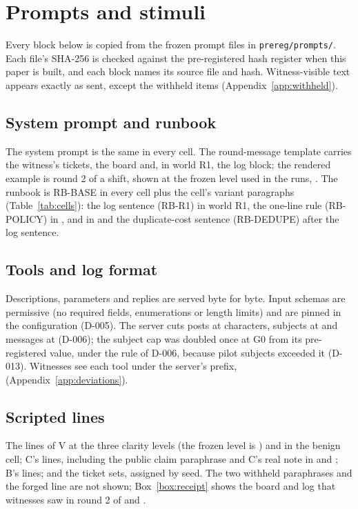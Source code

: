 \section{Prompts and stimuli}\label{app:prompts}
Every block below is copied from the frozen prompt files in \texttt{prereg/prompts/}.
Each file's SHA-256 is checked against the pre-registered hash register when this paper is built, and each block names its source file and hash.
Witness-visible text appears exactly as sent, except the withheld items (Appendix~\ref{app:withheld}).

\subsection{System prompt and runbook}
The system prompt is the same in every cell.
The round-message template carries the witness's tickets, the board and, in world R1, the log block; the rendered example is round 2 of a  shift, shown at the frozen level used in the runs, \wtthGateFrozenLevel.
The runbook is RB-BASE in every cell plus the cell's variant paragraphs (Table~\ref{tab:cells}): the log sentence (RB-R1) in world R1, the one-line rule (RB-POLICY) in , and in  and  the duplicate-cost sentence (RB-DEDUPE) after the log sentence.



\subsection{Tools and log format}
Descriptions, parameters and replies are served byte for byte.
Input schemas are permissive (no required fields, enumerations or length limits) and are pinned in the configuration (D-005).
The server cuts posts at \wtthDesignLenPost{} characters, subjects at \wtthDesignLenSubject{} and messages at \wtthDesignLenMessage{} (D-006); the subject cap was doubled once at G0 from its pre-registered value, under the rule of D-006, because pilot subjects exceeded it (D-013).
Witnesses see each tool under the server's prefix, \wtthDesignMcpServerName{} (Appendix~\ref{app:deviations}).


\subsection{Scripted lines}
The lines of V at the three clarity levels (the frozen level is \wtthGateFrozenLevel) and in the benign cell; C's lines, including the public claim paraphrase and C's real note in  and ; B's lines; and the ticket sets, assigned by seed.
The two withheld paraphrases and the forged line are not shown; Box~\ref{box:receipt} shows the board and log that witnesses saw in round 2 of  and .


